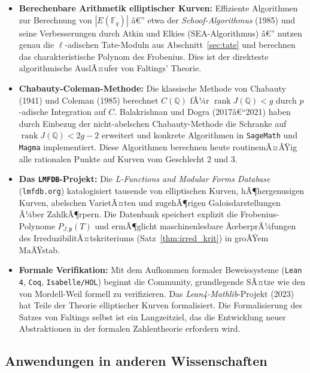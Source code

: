 ﻿\documentclass[12pt,a4paper]{article}
\theoremstyle{plain}
\theoremstyle{definition}
\theoremstyle{remark}
\newcommand{\Q}{\mathbb{Q}}
\newcommand{\F}{\mathbb{F}}
\DeclareMathOperator{\rank}{rank}
\begin{document}
\begin{itemize}[leftmargin=2em,itemsep=4pt]
  \item \textbf{Berechenbare Arithmetik elliptischer Kurven:}
    Effiziente Algorithmen zur Berechnung von $|E(\F_q)|$ â€” etwa der
    \emph{Schoof-Algorithmus} (1985) und seine Verbesserungen durch
    Atkin und Elkies (SEA-Algorithmus) â€” nutzen genau die $\ell$-adischen
    Tate-Moduln aus Abschnitt~\ref{sec:tate} und berechnen das charakteristische
    Polynom des Frobenius. Dies ist der direkteste algorithmische AuslÃ¤ufer
    von Faltings' Theorie.

  \item \textbf{Chabauty-Coleman-Methode:}
    Die klassische Methode von Chabauty (1941) und Coleman (1985) berechnet
    $C(\Q)$ fÃ¼r $\rank J(\Q) < g$ durch $p$-adische Integration auf $C$.
    Balakrishnan und Dogra (2017â€“2021) haben durch Einbezug der
    nicht-abelschen Chabauty-Methode die Schranke auf $\rank J(\Q) < 2g-2$
    erweitert und konkrete Algorithmen in \texttt{SageMath} und \texttt{Magma}
    implementiert. Diese Algorithmen berechnen heute routinemÃ¤ÃŸig alle rationalen
    Punkte auf Kurven vom Geschlecht 2 und 3.

  \item \textbf{Das \texttt{LMFDB}-Projekt:}
    Die \emph{L-Functions and Modular Forms Database} (\texttt{lmfdb.org}) katalogisiert
    tausende von elliptischen Kurven, hÃ¶hergenusigen Kurven, abelschen VarietÃ¤ten
    und zugehÃ¶rigen Galoisdarstellungen Ã¼ber ZahlkÃ¶rpern. Die Datenbank speichert
    explizit die Frobenius-Polynome $P_{J,\mathfrak p}(T)$ und ermÃ¶glicht
    maschinenlesbare ÃœberprÃ¼fungen des IrreduzibilitÃ¤tskriteriums
    (Satz~\ref{thm:irred_krit}) in groÃŸem MaÃŸstab.

  \item \textbf{Formale Verifikation:}
    Mit dem Aufkommen formaler Beweissysteme (\texttt{Lean 4}, \texttt{Coq},
    \texttt{Isabelle/HOL}) beginnt die Community, grundlegende SÃ¤tze wie den
    von Mordell-Weil formell zu verifizieren. Das \emph{Lean4-Mathlib}-Projekt
    (2023) hat Teile der Theorie elliptischer Kurven formalisiert.
    Die Formalisierung des Satzes von Faltings selbst ist ein Langzeitziel,
    das die Entwicklung neuer Abstraktionen in der formalen Zahlentheorie
    erfordern wird.
\end{itemize}

\subsection{Anwendungen in anderen Wissenschaften}
\end{document}

